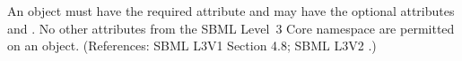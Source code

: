 An \InitialAssignment object must have the required attribute
 and may have the optional attributes  and
.  No other attributes from the SBML Level~3 Core namespace
are permitted on an \InitialAssignment object.  (References: SBML L3V1 Section 4.8; SBML L3V2
.)
